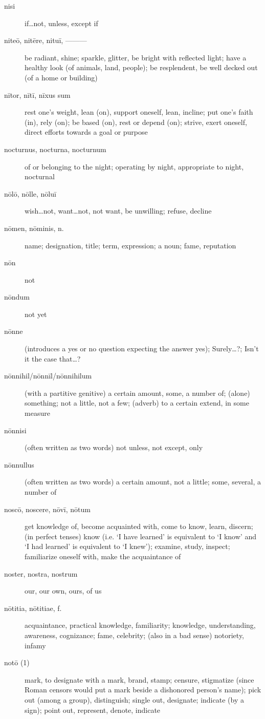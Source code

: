 \begin{description}
    \item[nisi] if\dots not, unless, except if
    \item[niteō, nitēre, nituī, ———] be radiant, shine; sparkle, glitter, be bright with reflected light; have a healthy look (of animals, land, people); be resplendent, be well decked out (of a home or building)
    \item[nītor, nītī, nīxus sum] rest one's weight, lean (on), support oneself, lean, incline; put one's faith (in), rely (on); be based (on), rest or depend (on); strive, exert oneself, direct efforts towards a goal or purpose
    \item[nocturnus, nocturna, nocturnum] of or belonging to the night; operating by night, appropriate to night, nocturnal
    \item[nōlō, nōlle, nōluī] wish\dots not, want\dots not, not want, be unwilling; refuse, decline
    \item[nōmen, nōminis, n.] name; designation, title; term, expression; a noun; fame, reputation
    \item[nōn] not
    \item[nōndum] not yet
    \item[nōnne] (introduces a yes or no question expecting the answer yes); Surely\dots ?; Isn't it the case that\dots ?
    \item[nōnnihil/nōnnīl/nōnnihilum] (with a partitive genitive) a certain amount, some, a number of; (alone) something; not a little, not a few; (adverb) to a certain extend, in some measure
    \item[nōnnisi] (often written as two words) not unless, not except, only
    \item[nōnnullus] (often written as two words) a certain amount, not a little; some, several, a number of
    \item[noscō, noscere, nōvī, nōtum] get knowledge of, become acquainted with, come to know, learn, discern; (in perfect tenses) know (i.e. `I have learned' is equivalent to `I know' and `I had learned' is equivalent to `I knew'); examine, study, inspect; familiarize oneself with, make the acquaintance of
    \item[noster, nostra, nostrum] our, our own, ours, of us
    \item[nōtitia, nōtitiae, f.] acquaintance, practical knowledge, familiarity; knowledge, understanding, awareness, cognizance; fame, celebrity; (also in a bad sense) notoriety, infamy
    \item[notō (1)] mark, to designate with a mark, brand, stamp; censure, stigmatize (since Roman censors would put a mark beside a dishonored person's name); pick out (among a group), distinguish; single out, designate; indicate (by a sign); point out, represent, denote, indicate

\end{description}
